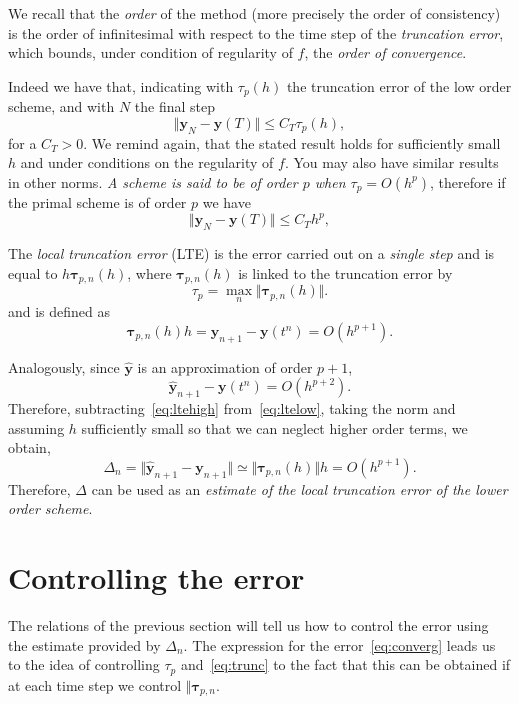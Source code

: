\documentclass[10pt,a4paper,twoside]{article}
\begin{document}
We recall that the \emph{order} of the method (more precisely the order of consistency) is 
the order of infinitesimal with respect to the time step  of the \emph{truncation error}, which bounds, 
under condition of regularity of $f$, the \emph{order of convergence}. 


Indeed we have that, indicating with $\tau_p(h)$ the truncation error of the low order scheme, and with $N$ the final step
\begin{equation}\label{eq:converg}
\Vert \mathbf{y}_{N}-\mathbf{y}(T)\Vert \le C_T \tau_p(h),
\end{equation}
for a $C_T>0$.
We remind again, that the stated result holds for sufficiently small $h$ and under conditions 
on the regularity of $f$. You may also have similar results in other norms.
\emph{A scheme is said to be of order $p$ when $\tau_p=O(h^p)$}, therefore if the primal scheme is of order $p$ we have
\[
    \Vert \mathbf{y}_{N}-\mathbf{y}(T)\Vert \le C_T h^p,
\]



The \emph{local truncation error} (LTE) is the error carried out on a \emph{single step} 
and is equal to $h\boldsymbol{\tau}_{p,n}(h)$, where $\boldsymbol{\tau}_{p,n}(h)$ is linked to the truncation error by  
\begin{equation}\label{eq:trunc}
\tau_p=\max_n \Vert\boldsymbol{\tau}_{p,n}(h)\Vert.
\end{equation}
and is defined as
\begin{equation}\label{eq:ltelow}
\boldsymbol\tau_{p,n}(h) h=\mathbf{y}_{n+1}-\mathbf{y}(t^n) =O(h^{p+1}).
\end{equation}

Analogously, since $\hat{\mathbf{y}}$ is an approximation of order $p+1$,
\begin{equation}\label{eq:ltehigh}
\hat{\mathbf{y}}_{n+1}-\mathbf{y}(t^n) =O(h^{p+2}).
\end{equation}
Therefore, subtracting~\eqref{eq:ltehigh} from~\eqref{eq:ltelow}, taking the norm and assuming $h$ sufficiently small so that we can neglect higher order terms, we obtain,
\begin{equation}\label{eq:delta}
\Delta_n=\Vert \hat{\mathbf{y}}_{n+1}-\mathbf{y}_{n+1} \Vert\simeq \Vert \boldsymbol\tau_{p,n}(h)\Vert  h= O(h^{p+1}).
\end{equation}
Therefore, $\Delta$ can be used as an \emph{estimate of the local truncation error of the lower order scheme}.
\section{Controlling the error}
The relations of the previous section will tell us how to control the error using the estimate provided by $\Delta_n$. The expression for the error~\eqref{eq:converg}
 leads us to the idea of controlling $\tau_p$ and~\eqref{eq:trunc} to the fact that this can be obtained if at each time step we control $\Vert\boldsymbol{\tau}_{p,n}$.
 
\end{document}
